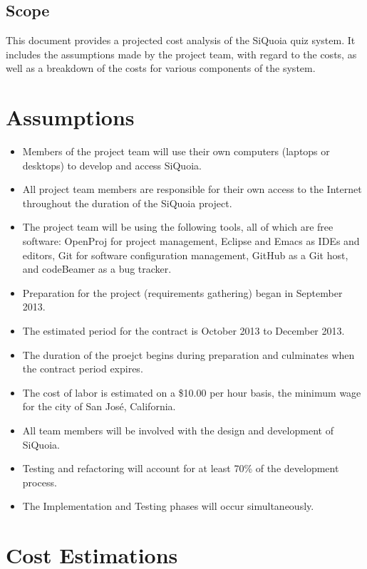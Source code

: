 \documentclass[12pt]{article}
\begin{document}
\subsection{Scope}
This document provides a projected cost analysis of the SiQuoia quiz
system. It includes the assumptions made by the project team, with
regard to the costs, as well as a breakdown of the costs for various
components of the system.

\section{Assumptions}
\begin{itemize}
\item Members of the project team will use their own computers
  (laptops or desktops) to develop and access SiQuoia.
\item All project team members are responsible for their own access to
  the Internet throughout the duration of the SiQuoia project.
\item The project team will be using the following tools, all of which
  are free software: OpenProj for project management, Eclipse and
  Emacs as IDEs and editors, Git for software configuration
  management, GitHub as a Git host, and codeBeamer as a bug tracker.
\item Preparation for the project (requirements gathering) began in
  September 2013.
\item The estimated period for the contract is October 2013 to
  December 2013.
\item The duration of the proejct begins during preparation and
  culminates when the contract period expires.
\item The cost of labor is estimated on a \$10.00 per hour basis, the
  minimum wage for the city of San Jos{\'e}, California.
\item All team members will be involved with the design and
  development of SiQuoia.
\item Testing and refactoring will account for at least 70\% of the
  development process.
\item The Implementation and Testing phases will occur simultaneously.
\end{itemize}

\section{Cost Estimations}
\end{document}
